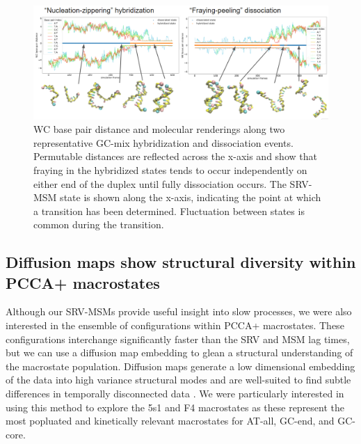 \documentclass[journal=jpcbfk,manuscript=article]{achemso}
\begin{document}
\begin{figure} %
	\begin{center}
        \includegraphics[width=\textwidth]{Figs/figs_imp/GC-mix_transitions.PNG}
        \caption{WC base pair distance and molecular renderings along two representative GC-mix hybridization and dissociation events. Permutable distances are reflected across the x-axis and show that fraying in the hybridized states tends to occur independently on either end of the duplex until fully dissociation occurs. The SRV-MSM state is shown along the x-axis, indicating the point at which a transition has been determined. Fluctuation between states is common during the transition.}
        \label{fig:GC-mix_transitions}
	\end{center}
\end{figure}

\subsection{Diffusion maps show structural diversity within PCCA+ macrostates}

Although our SRV-MSMs provide useful insight into slow processes, we were also interested in the ensemble of configurations within PCCA+ macrostates. These configurations interchange significantly faster than the SRV and MSM lag times, but we can use a diffusion map embedding to glean a structural understanding of the macrostate population. Diffusion maps generate a low dimensional embedding of the data into high variance structural modes and are well-suited to find subtle differences in temporally disconnected data \citep{Coifman2006DiffusionMaps, Ferguson2010SystematicMaps}. We were particularly interested in using this method to explore the 5s1 and F4 macrostates as these represent the most popluated and kinetically relevant macrostates for AT-all, GC-end, and GC-core.
\end{document}
